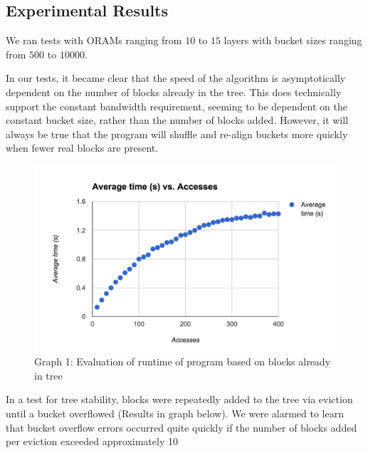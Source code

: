 \documentclass[12pt, oneside]{article}   	%
\begin{document}
\subsection{Experimental Results}

We ran tests with ORAMs ranging from $10$ to $15$ layers with bucket sizes ranging from $500$ to $10000$.

In our tests, it became clear that the speed of the algorithm is asymptotically dependent on the number of blocks already in the tree. This does technically support the constant bandwidth requirement, seeming to be dependent on the constant bucket size, rather than the number of blocks added. However, it will always be true that the program will shuffle and re-align buckets more quickly when fewer real blocks are present.

\begin{figure}[h!]
  \includegraphics[width=\linewidth]{runtimegraph}
  \caption{Graph 1: Evaluation of runtime of program based on blocks already in tree}
  \label{fig:runtimegraph}
\end{figure}


In a test for tree stability, blocks were repeatedly added to the tree via eviction until a bucket overflowed (Results in graph below). We were alarmed to learn that bucket overflow errors occurred quite quickly if the number of blocks added per eviction exceeded approximately 10%
\end{document}
